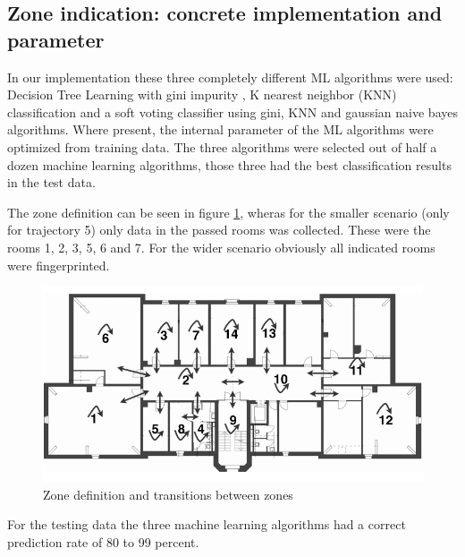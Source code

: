 \subsection{Zone indication: concrete implementation and parameter}
In our implementation these three completely different ML algorithms were used: Decision Tree Learning with gini impurity \cite{WikiGini}, K nearest neighbor (KNN) classification \cite{KNN} and a soft voting classifier using gini, KNN and gaussian naive bayes \cite{SKLearn, GaussianNB} algorithms.
Where present, the internal parameter of the ML algorithms were optimized from training data. The three algorithms were selected out of half a dozen machine learning algorithms, those three had the best classification results in the test data.

The zone definition can be seen in figure \ref{fig:zone_definition}, wheras for the smaller scenario (only for trajectory 5) only data in the passed rooms was collected. These were the rooms 1, 2, 3, 5, 6 and 7.  For the wider scenario obviously all indicated rooms were fingerprinted.

\begin{figure}[th]
\centering
\includegraphics[width=1.0\textwidth]{Figures/zone_definition}
\decoRule
\caption[Zone definition]{Zone definition and transitions between zones}
\label{fig:zone_definition}
\end{figure}

For the testing data the three machine learning algorithms had a correct prediction rate of 80 to 99 percent. 

